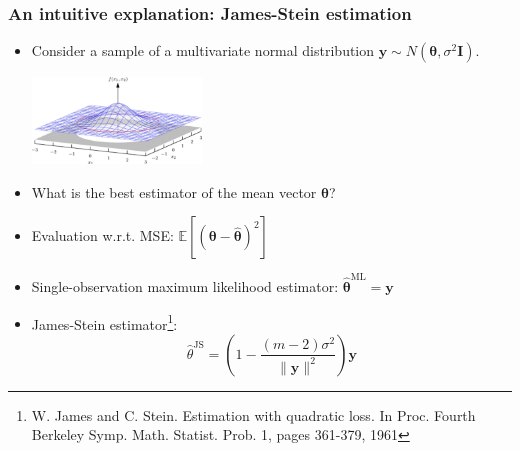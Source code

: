 \documentclass[]{beamer}
\renewcommand{\vec}[1]{\boldsymbol{#1}}
\newcommand{\by}{\boldsymbol{y}}
\begin{document}
\begin{frame}
\frametitle{An intuitive explanation: James-Stein estimation}

\begin{itemize}
\item Consider a sample of a multivariate normal distribution $\by \sim N(\vec{\theta}, \sigma^2\mathbf{I})$.
\begin{center}
\includegraphics[width = 4.5cm]{Figures/biva}
\end{center}
\item What is the best estimator of the mean vector $\vec{\theta}$?
\item Evaluation w.r.t. MSE: $\mathbb{E}[(\vec\theta - \hat{\vec\theta})^2]$ \pause 
\item Single-observation maximum likelihood estimator: $\hat{\vec\theta}^{\mathrm{ML}} = \by$ \pause 
\item James-Stein estimator\footnote{W. James and C. Stein. Estimation with quadratic loss. In Proc. Fourth Berkeley Symp. Math.
Statist. Prob. 1, pages 361-379, 1961}: 
$$
\hat{\theta}^{\mathrm{JS}} = \left (1 - \frac{(m-2)\sigma^2}{\|\by\|^2} \right )\by
$$
\end{itemize}

\end{frame}
\end{document}
